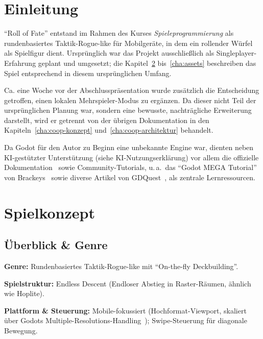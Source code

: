 \documentclass[oneside]{ausarbeitung}
\begin{document}
\cleardoublepage
{}
\setcounter{page}{1}

\chapter{Einleitung}
\label{cha:einleitung}

\enquote{Roll of Fate} entstand im Rahmen des Kurses \textit{Spieleprogrammierung} als rundenbasiertes
Taktik-Rogue-like für Mobilgeräte, in dem ein rollender Würfel als Spielfigur dient. Ursprünglich war
das Projekt ausschließlich als Singleplayer-Erfahrung geplant und umgesetzt; die Kapitel~\ref{cha:spielkonzept}
bis~\ref{cha:assets} beschreiben das Spiel entsprechend in diesem ursprünglichen Umfang.

Ca. eine Woche vor der Abschlusspräsentation wurde zusätzlich die Entscheidung getroffen, einen
lokalen Mehrspieler-Modus zu ergänzen. Da dieser nicht Teil der ursprünglichen Planung war, sondern
eine bewusste, nachträgliche Erweiterung darstellt, wird er getrennt von der übrigen Dokumentation in
den Kapiteln~\ref{cha:coop-konzept} und~\ref{cha:coop-architektur} behandelt.

Da Godot für den Autor zu Beginn eine unbekannte Engine war, dienten neben KI-gestützter Unterstützung
(siehe KI-Nutzungserklärung) vor allem die offizielle Dokumentation~\cite{godot:docs} sowie
Community-Tutorials, u.\,a.\ das \enquote{Godot MEGA Tutorial} von Brackeys~\cite{brackeys:megatutorial}
sowie diverse Artikel von GDQuest~\cite{gdquest:godot}, als
zentrale Lernressourcen.

\chapter{Spielkonzept}
\label{cha:spielkonzept}
\section{Überblick \& Genre}

\textbf{Genre:} Rundenbasiertes Taktik-Rogue-like mit \enquote{On-the-fly Deckbuilding}.

\textbf{Spielstruktur:} Endless Descent (Endloser Abstieg in Raster-Räumen, ähnlich wie Hoplite).

\textbf{Plattform \& Steuerung:} Mobile-fokussiert (Hochformat-Viewport, skaliert über Godots
Multiple-Resolutions-Handling~\cite{godot:multipleresolutions}); Swipe-Steuerung für diagonale Bewegung.
\end{document}
